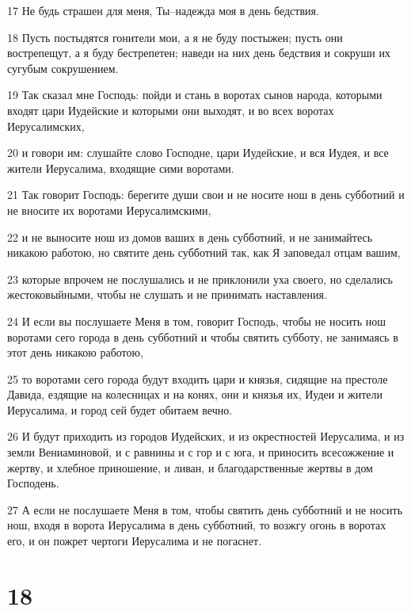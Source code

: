 \par 17 Не будь страшен для меня, Ты--надежда моя в день бедствия.
\par 18 Пусть постыдятся гонители мои, а я не буду постыжен; пусть они вострепещут, а я буду бестрепетен; наведи на них день бедствия и сокруши их сугубым сокрушением.
\par 19 Так сказал мне Господь: пойди и стань в воротах сынов народа, которыми входят цари Иудейские и которыми они выходят, и во всех воротах Иерусалимских,
\par 20 и говори им: слушайте слово Господне, цари Иудейские, и вся Иудея, и все жители Иерусалима, входящие сими воротами.
\par 21 Так говорит Господь: берегите души свои и не носите нош в день субботний и не вносите их воротами Иерусалимскими,
\par 22 и не выносите нош из домов ваших в день субботний, и не занимайтесь никакою работою, но святите день субботний так, как Я заповедал отцам вашим,
\par 23 которые впрочем не послушались и не приклонили уха своего, но сделались жестоковыйными, чтобы не слушать и не принимать наставления.
\par 24 И если вы послушаете Меня в том, говорит Господь, чтобы не носить нош воротами сего города в день субботний и чтобы святить субботу, не занимаясь в этот день никакою работою,
\par 25 то воротами сего города будут входить цари и князья, сидящие на престоле Давида, ездящие на колесницах и на конях, они и князья их, Иудеи и жители Иерусалима, и город сей будет обитаем вечно.
\par 26 И будут приходить из городов Иудейских, и из окрестностей Иерусалима, и из земли Вениаминовой, и с равнины и с гор и с юга, и приносить всесожжение и жертву, и хлебное приношение, и ливан, и благодарственные жертвы в дом Господень.
\par 27 А если не послушаете Меня в том, чтобы святить день субботний и не носить нош, входя в ворота Иерусалима в день субботний, то возжгу огонь в воротах его, и он пожрет чертоги Иерусалима и не погаснет.

\chapter{18}

